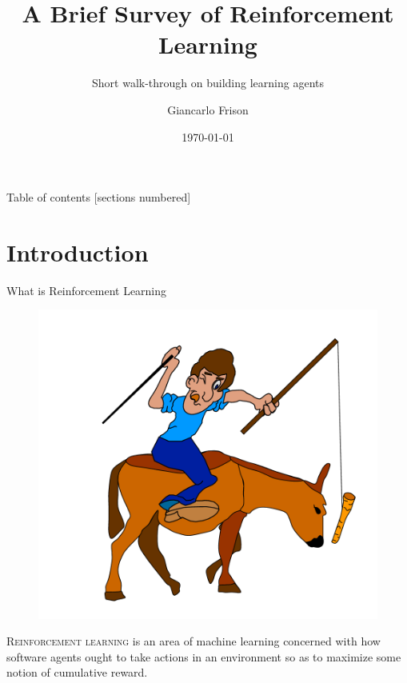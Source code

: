 \documentclass[aspectratio=169]{beamer}
\title{A Brief Survey of Reinforcement Learning}
\subtitle{Short walk-through on building learning agents}
\date{\today}
\author{Giancarlo Frison}
\begin{document}

\maketitle

\begin{frame}[allowframebreaks]{Table of contents}
  [sections numbered]
  \tableofcontents[hideallsubsections]
\end{frame}

\section{Introduction}
\begin{frame}[fragile]{What is Reinforcement Learning}
	\begin{figure}[t!]	
	\centering
	\includegraphics[scale=0.3]{img/donkey.png}
	\cite{donkey}
	\end{figure}
	\textsc{Reinforcement learning} is an area of machine learning concerned with how software agents ought to take actions in an environment so as to maximize some notion of cumulative reward.
\end{frame}
\end{document}
